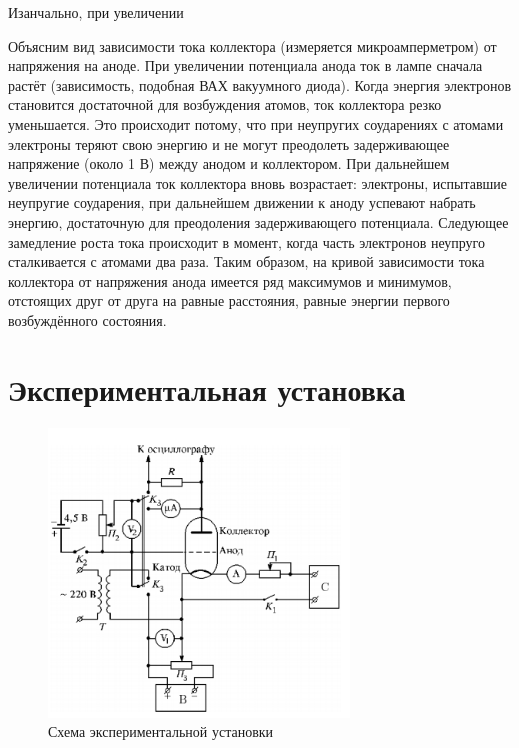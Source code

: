 \documentclass[a4paper]{article}
\begin{document}
Изанчально, при увеличении

Объясним вид зависимости тока коллектора (измеряется микроамперметром) от напряжения на аноде. 
При увеличении потенциала анода ток в лампе сначала растёт (зависимость, подобная ВАХ вакуумного диода). 
Когда энергия электронов становится достаточной для возбуждения атомов, ток коллектора резко уменьшается. 
Это происходит потому, что при неупругих соударениях с атомами электроны теряют свою энергию и 
не могут преодолеть задерживающее напряжение (около 1 В) между анодом и коллектором. 
При дальнейшем увеличении потенциала ток коллектора вновь возрастает: электроны, испытавшие неупругие соударения, 
при дальнейшем движении к аноду успевают набрать энергию, достаточную для преодоления задерживающего потенциала. 
Следующее замедление роста тока происходит в момент, 
когда часть электронов неупруго сталкивается с атомами два раза. 
Таким образом, на кривой зависимости тока коллектора от напряжения анода имеется ряд максимумов и минимумов, 
отстоящих друг от друга на равные расстояния, равные энергии первого возбуждённого состояния.

\section{Экспериментальная установка}

\begin{figure}[h]
    \centering
    \includegraphics[width=8cm]{fig3.PNG}
    \caption{Схема экспериментальной установки}
    \label{fig:vac}
\end{figure}
\end{document}

